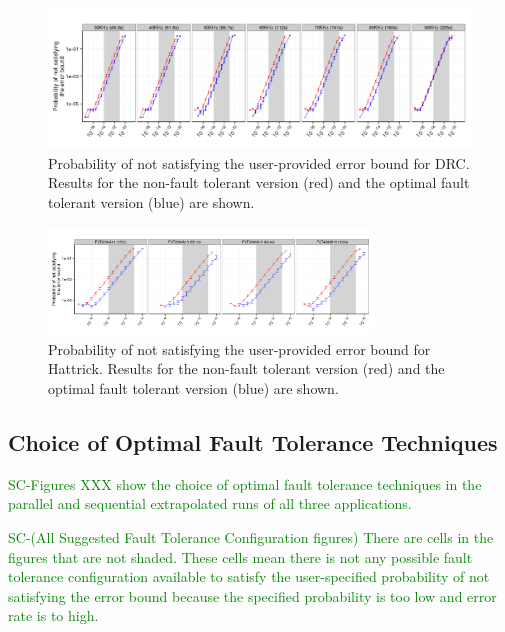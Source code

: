\documentclass[10pt, conference, compsocconf]{IEEEtran}
\newcommand{\sui}[1]{%
  \textcolor{green}{SC-#1}
}
\begin{document}
\begin{figure}[ht!]
\centering
\includegraphics[width=7in]{figs/DRC_Par_Seq_ImperfectRate_log.png}
\vspace{-10pt}
\caption{Probability of not satisfying the user-provided error bound for DRC. Results for the non-fault tolerant version (red) and the optimal fault tolerant version (blue) are shown.}
\vspace{-10pt}
\label{fig:DRC_ImperfectRate}
\end{figure}

\begin{figure}[ht!]
\centering
\includegraphics[width=3.4in]{figs/Hattrick_Par_Seq_ImperfectRate_log.png}
\vspace{-10pt}
\caption{Probability of not satisfying the user-provided error bound for Hattrick. Results for the non-fault tolerant version (red) and the optimal fault tolerant version (blue) are shown.}
\vspace{-10pt}
\label{fig:Hattrick_ImperfectRate}
\end{figure}

\subsection{Choice of Optimal Fault Tolerance Techniques}
\label{sec:eval:optchoice}

\sui{Figures XXX show the choice of optimal fault tolerance techniques in the parallel and sequential extrapolated runs of all three applications.}

\sui{(All Suggested Fault Tolerance Configuration figures)
There are cells in the figures that are not shaded. These cells mean there is not any possible fault tolerance configuration available to satisfy the user-specified probability of not satisfying the error bound because the specified probability is too low and error rate is to high.}
\end{document}

